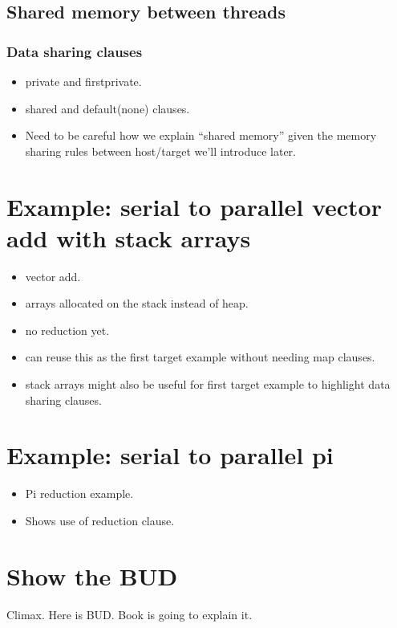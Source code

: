 \subsection{Shared memory between threads}
\subsubsection{Data sharing clauses}
\begin{itemize}
  \item private and firstprivate.
  \item shared and default(none) clauses.
  \item Need to be careful how we explain “shared memory” given the memory sharing rules between host/target we’ll introduce later.
\end{itemize}

\section{Example: serial to parallel vector add with stack arrays}
\begin{itemize}
  \item vector add.
  \item arrays allocated on the stack instead of heap.
  \item no reduction yet.
  \item can reuse this as the first target example without needing map clauses.
  \item stack arrays might also be useful for first target example to highlight data sharing clauses.
\end{itemize}

\section{Example: serial to parallel pi}
\begin{itemize}
  \item Pi reduction example.
  \item Shows use of reduction clause.
\end{itemize}

\section{Show the BUD}
Climax. Here is BUD. Book is going to explain it.




